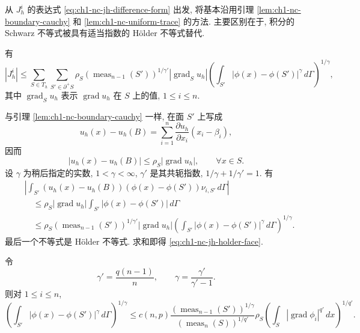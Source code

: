 从 $J_h^i$ 的表达式 \eqref{eq:ch1-nc-jh-difference-form} 出发, 将基本沿用引理 \ref{lem:ch1-nc-boundary-cauchy} 和 \ref{lem:ch1-nc-uniform-trace} 的方法. 主要区别在于, 积分的 Schwarz 不等式被具有适当指数的 Hölder 不等式替代.

\begin{Lemma}
\label{lem:ch1-nc-jh-holder-face}
有
\begin{equation}
|J_h^i|\leq\sum_{S\in T_h}\sum_{S'\in\partial^+S}
\rho_S(\operatorname{meas}_{n-1}(S'))^{1/\gamma'}
|\operatorname{grad}_S u_h|
\left(\int_{S'}|\phi(x)-\phi(S')|^\gamma\,d\Gamma\right)^{1/\gamma},
\label{eq:ch1-nc-jh-holder-face}
\end{equation}
其中 $\operatorname{grad}_S u_h$ 表示 $\operatorname{grad}u_h$ 在 $S$ 上的值, $1\leq i\leq n$.
\end{Lemma}

\begin{Proof}
与引理 \ref{lem:ch1-nc-boundary-cauchy} 一样, 在面 $S'$ 上写成
\[
u_h(x)-u_h(B)=\sum_{i=1}^n\frac{\partial u_h}{\partial x_i}(x_i-\beta_i),
\]
因而
\begin{equation}
|u_h(x)-u_h(B)|\leq\rho_S|\operatorname{grad}u_h|,
\qquad\forall x\in S.
\label{eq:ch1-nc-linear-face-pointwise}
\end{equation}
设 $\gamma$ 为稍后指定的实数, $1<\gamma<\infty$, $\gamma'$ 是其共轭指数, $1/\gamma+1/\gamma'=1$. 有
\[
\begin{aligned}
&\left|\int_{S'}(u_h(x)-u_h(B))(\phi(x)-\phi(S'))
\nu_{i,S'}\,d\Gamma\right|\\
&\quad\leq\rho_S|\operatorname{grad}u_h|
\int_{S'}|\phi(x)-\phi(S')|\,d\Gamma\\
&\quad\leq\rho_S(\operatorname{meas}_{n-1}(S'))^{1/\gamma'}
|\operatorname{grad}u_h|
\left(\int_{S'}|\phi(x)-\phi(S')|^\gamma\,d\Gamma\right)^{1/\gamma}.
\end{aligned}
\]
最后一个不等式是 Hölder 不等式. 求和即得 \eqref{eq:ch1-nc-jh-holder-face}.
\end{Proof}

\begin{Lemma}
\label{lem:ch1-nc-trace-holder}
令
\[
\gamma'=\frac{q(n-1)}n,
\qquad\gamma=\frac{\gamma'}{\gamma'-1}.
\]
则对 $1\leq i\leq n$,
\begin{equation}
\left(\int_{S'}|\phi(x)-\phi(S')|^\gamma\,d\Gamma\right)^{1/\gamma}
\leq c(n,p)\frac{(\operatorname{meas}_{n-1}(S'))^{1/\gamma}}
{(\operatorname{meas}_n(S))^{1/q'}}\rho_S
\left(\int_S|\operatorname{grad}\phi_i|^{q'}\,dx\right)^{1/q'}.
\label{eq:ch1-nc-trace-holder}
\end{equation}
\end{Lemma}

